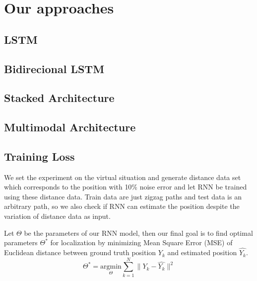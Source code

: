 \documentclass[letterpaper, 10 pt, conference]{ieeeconf}  %
\begin{document}
\section{Our approaches}
\subsection{LSTM}

\subsection{Bidirecional LSTM}

\subsection{Stacked Architecture}

\subsection{Multimodal Architecture}

\subsection{Training Loss}

We set the experiment on the virtual situation and generate distance data set which corresponds to the position with 10\% noise error and let RNN be trained using these distance data. Train data are just zigzag paths and test data is an arbitrary path, so we also check if RNN can estimate the position despite the variation of distance data as input.

Let $\Theta$ be the parameters of our RNN model, then our final goal is to find optimal parameters $\Theta^{*}$ for localization by minimizing Mean Square Error (MSE) of Euclidean distance between ground truth position $Y_k$ and estimated position $\hat{Y_k}$.
\begin{equation}
\Theta^{*} = \underset{\Theta}{\mathrm{argmin}} \sum_{k=1}^N \parallel Y_k - \hat{Y_k} \parallel^{2}
\end{equation}  
\end{document}

